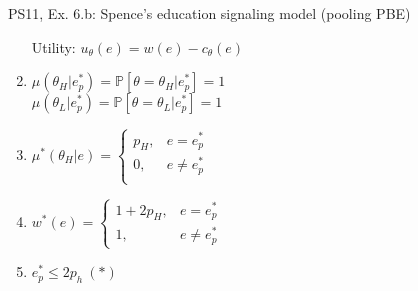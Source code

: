 \begin{frame}{PS11, Ex. 6.b: Spence’s education signaling model (pooling PBE)}
\begin{multicols}{2}
\begin{enumerate}
        \item[Utility:] \vspace{-2pt}$u_\theta(e)=w(e)-c_\theta(e)$
        \item \vspace{-2pt}$\mu\left(\theta_H|e_p^*\right)=
               \mathbb{P}\left[\theta=\theta_H|e_p^*\right]=1$\\
              $\mu\left(\theta_L|e_p^*\right)=
               \mathbb{P}\left[\theta=\theta_L|e_p^*\right]=1$
        \item \vspace{-2pt}$\mu^*(\theta_H|e)=\left\{\begin{array}{ll}
                  p_H, & e = e_p^* \\
                  0, & e \neq e_p^* \\
               \end{array}\right.$
        \item \vspace{-2pt}$w^*(e)=\left\{\begin{array}{ll}
                  1+2p_H, & e = e_p^* \\
                  1, & e \neq e_p^*
               \end{array}\right.$
        \item \vspace{-2pt}$e_p^*\leq2p_h\ (*)$
      \end{enumerate}
    \end{multicols}
    \vfill\null
\end{frame}
